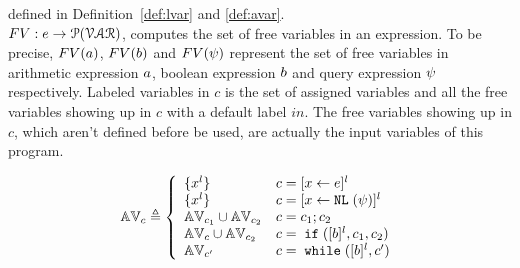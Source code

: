 {defined in Definition~\ref{def:lvar} and \ref{def:avar}.
%
\\
$FV: e \to \mathcal{P}(\mathcal{VAR})$, computes the set of free variables in an expression. To be precise,
$FV(a)$, $FV(b)$ and $FV(\psi)$ represent the set of free variables in arithmetic
expression $a$, boolean expression $b$ and query expression $\psi$ respectively.
Labeled variables in $c$ is the set of assigned variables and all the free variables
showing up in $c$ with a default label $in$. 
The free variables
showing up in $c$, which aren't defined before be used, are actually the input variables of this program.
%
\begin{defn}
\label{def:avar}
{
$$ \avar_{c} \triangleq
  \left\{
  \begin{array}{ll}
      \{{x}^l\}                   
      & {c} = [{\assign x e}]^{l} 
      \\
      \{{x}^l\}                   
      & {c} = [{\assign x \query(\qexpr)}]^{l} 
      \\
      \avar_{{c_1}} \cup \avar_{{c_2}}  
      & {c} = {c_1};{c_2}
      \\
      \avar_{{c}} \cup \avar_{{c_2}} 
      & {c} =\eif([\bexpr]^{l}, c_1, c_2) 
      \\
      \avar_{{c}'}
      & {c}   = \ewhile ([\bexpr]^{l}, {c}')
\end{array}
\right.
$$
}
\end{defn}
%

}
